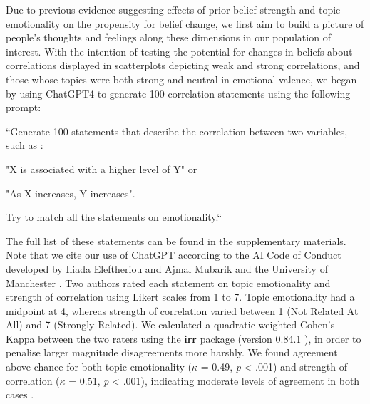 \documentclass[manuscript,screen,review]{acmart}
\begin{document}
Due to previous evidence suggesting effects of prior belief strength and
topic emotionality on the propensity for belief change, we first aim to
build a picture of people's thoughts and feelings along these dimensions
in our population of interest. With the intention of testing the
potential for changes in beliefs about correlations displayed in
scatterplots depicting weak and strong correlations, and those whose
topics were both strong and neutral in emotional valence, we began by
using ChatGPT4 \citep{chatgpt} to generate 100 correlation statements
using the following prompt:

\begin{flushleft}

    ``Generate 100 statements that describe the correlation between two variables, such as :

     "X is associated with a higher level of Y" or

     "As X increases, Y increases".

    Try to match all the statements on emotionality.``
    
\end{flushleft}

The full list of these statements can be found in the supplementary
materials. Note that we cite our use of ChatGPT according to the AI Code
of Conduct developed by Iliada Eleftheriou and Ajmal Mubarik and the
University of Manchester \citep{iliada_2023}. Two authors rated each
statement on topic emotionality and strength of correlation using Likert
scales from 1 to 7. Topic emotionality had a midpoint at 4, whereas
strength of correlation varied between 1 (Not Related At All) and 7
(Strongly Related). We calculated a quadratic weighted Cohen's Kappa
between the two raters using the \textbf{irr} package (version 0.84.1
\citep{irr}), in order to penalise larger magnitude disagreements more
harshly. We found agreement above chance for both topic emotionality
(\(\kappa\) = 0.49, \emph{p} \textless{} .001) and strength of
correlation (\(\kappa\) = 0.51, \emph{p} \textless{} .001), indicating
moderate levels of agreement in both cases
\citep{cohen_1968, fleiss_1969}.
\end{document}
